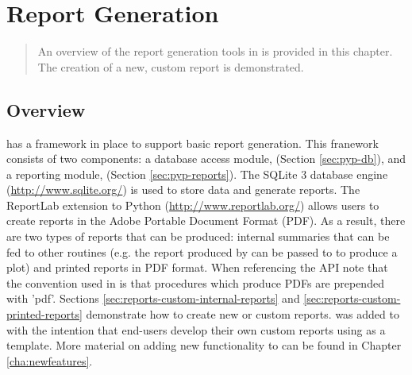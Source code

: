 \chapter{Report Generation}
\label{cha:reports}
\begin{quote}
An overview of the report generation tools in \PyPedal{} is provided in this chapter.  The creation of a new, custom report
is demonstrated.
\end{quote}
\section{Overview}
\label{sec:reports-overview}
\PyPedal{} has a framework in place to support basic report generation.  This franework consists of two components: a database access module,  (Section \ref{sec:pyp-db}), and a reporting module,  (Section \ref{sec:pyp-reports}).  The SQLite 3 database engine (\url{http://www.sqlite.org/}) is used to store data and generate reports.  The ReportLab extension to Python (\url{http://www.reportlab.org/}) allows users to create reports in the Adobe Portable Document Format (PDF).  As a result, there are two types of reports that can be produced: internal summaries that can be fed to other \PyPedal{} routines (e.g. the report produced by  can be passed to  to produce a plot) and printed reports in PDF format.  When referencing the  API note that the convention used in \PyPedal{} is that procedures which produce PDFs are prepended with 'pdf'.  Sections \ref{sec:reports-custom-internal-reports} and \ref{sec:reports-custom-printed-reports} demonstrate how to create new or custom reports.   was added to \PyPedal{} with the intention that end-users develop their own custom reports using  as a template.  More material on adding new functionality to \PyPedal{} can be found in Chapter \ref{cha:newfeatures}.

